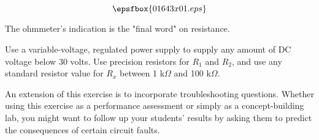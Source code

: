 

$$\epsfbox{01643x01.eps}$$

\vfil \eject






The ohmmeter's indication is the "final word" on resistance.







Use a variable-voltage, regulated power supply to supply any amount of DC voltage below 30 volts.  Use precision resistors for $R_1$ and $R_2$, and use any standard resistor value for $R_x$ between 1 k$\Omega$ and 100 k$\Omega$.

An extension of this exercise is to incorporate troubleshooting questions.  Whether using this exercise as a performance assessment or simply as a concept-building lab, you might want to follow up your students' results by asking them to predict the consequences of certain circuit faults.




